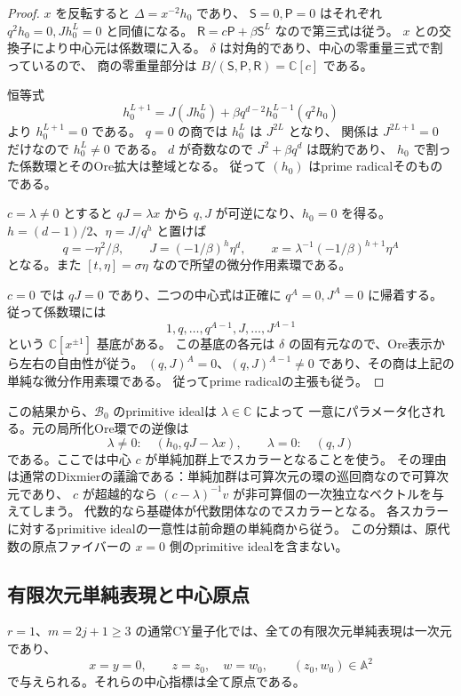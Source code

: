 \begin{proof}
$x$ を反転すると $\Delta=x^{-2}h_0$ であり、
$\mathsf S=0,\mathsf P=0$ はそれぞれ $q^2h_0=0,Jh_0^L=0$ と同値になる。
$\mathsf R=c\mathsf P+\beta\mathsf S^L$ なので第三式は従う。
$x$ との交換子により中心元は係数環に入る。
$\delta$ は対角的であり、中心の零重量三式で割っているので、
商の零重量部分は $B/(\mathsf S,\mathsf P,\mathsf R)=\mathbb C[c]$ である。

恒等式
\[
 h_0^{L+1}=J(Jh_0^L)+\beta q^{d-2}h_0^{L-1}(q^2h_0)
\]
より $h_0^{L+1}=0$ である。
$q=0$ の商では $h_0^L$ は $J^{2L}$ となり、
関係は $J^{2L+1}=0$ だけなので $h_0^L\ne0$ である。
$d$ が奇数なので $J^2+\beta q^d$ は既約であり、
$h_0$ で割った係数環とそのOre拡大は整域となる。
従って $(h_0)$ はprime radicalそのものである。

$c=\lambda\ne0$ とすると $qJ=\lambda x$ から $q,J$ が可逆になり、$h_0=0$ を得る。
$h=(d-1)/2$、$\eta=J/q^h$ と置けば
\[
 q=-\eta^2/\beta,\qquad
 J=(-1/\beta)^h\eta^d,\qquad
 x=\lambda^{-1}(-1/\beta)^{h+1}\eta^A
\]
となる。また $[t,\eta]=\sigma\eta$ なので所望の微分作用素環である。

$c=0$ では $qJ=0$ であり、二つの中心式は正確に $q^A=0,J^A=0$ に帰着する。
従って係数環には
\[
 1,q,\ldots,q^{A-1},J,\ldots,J^{A-1}
\]
という $\mathbb C[x^{\pm1}]$ 基底がある。
この基底の各元は $\delta$ の固有元なので、Ore表示から左右の自由性が従う。
$(q,J)^A=0$、$(q,J)^{A-1}\ne0$ であり、その商は上記の単純な微分作用素環である。
従ってprime radicalの主張も従う。
\end{proof}

この結果から、$\mathcal B_0$ のprimitive idealは $\lambda\in\mathbb C$ によって
一意にパラメータ化される。元の局所化Ore環での逆像は
\[
 \lambda\ne0:\quad(h_0,qJ-\lambda x),\qquad
 \lambda=0:\quad(q,J)
\]
である。ここでは中心 $c$ が単純加群上でスカラーとなることを使う。
その理由は通常のDixmierの議論である：単純加群は可算次元の環の巡回商なので可算次元であり、
$c$ が超越的なら $(c-\lambda)^{-1}v$ が非可算個の一次独立なベクトルを与えてしまう。
代数的なら基礎体が代数閉体なのでスカラーとなる。
各スカラーに対するprimitive idealの一意性は前命題の単純商から従う。
この分類は、原代数の原点ファイバーの $x=0$ 側のprimitive idealを含まない。

\subsection{有限次元単純表現と中心原点}

\begin{proposition}[有限次元単純表現]
\label{prop:finite-simples-v35}
$r=1$、$m=2j+1\ge3$ の通常CY量子化では、全ての有限次元単純表現は一次元であり、
\[
 x=y=0,\qquad z=z_0,\quad w=w_0,
 \qquad (z_0,w_0)\in\mathbb A^2
\]
で与えられる。それらの中心指標は全て原点である。
\end{proposition}

